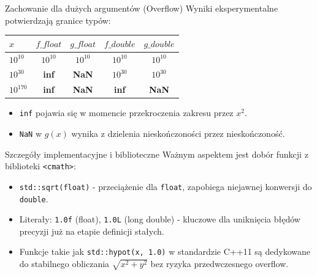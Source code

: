 \documentclass[10pt]{beamer}
\begin{document}
\begin{frame}{Zachowanie dla dużych argumentów (Overflow)}
    Wyniki eksperymentalne potwierdzają granice typów:
    \begin{table}[]
        \small
        \centering
        \begin{tabular}{@{}lcccc@{}}
            \toprule
            $x$ & $f\_float$ & $g\_float$ & $f\_double$ & $g\_double$ \\ \midrule
            $10^{10}$ & $10^{10}$ & $10^{10}$ & $10^{10}$ & $10^{10}$ \\
            $10^{30}$ & \textbf{inf} & \textbf{NaN} & $10^{30}$ & $10^{30}$ \\
            $10^{170}$ & \textbf{inf} & \textbf{NaN} & \textbf{inf} & \textbf{NaN} \\ \bottomrule
        \end{tabular}
    \end{table}
    \begin{itemize}
        \item \texttt{inf} pojawia się w momencie przekroczenia zakresu przez $x^2$.
        \item \texttt{NaN} w $g(x)$ wynika z dzielenia nieskończoności przez nieskończoność.
    \end{itemize}
\end{frame}

\begin{frame}{Szczegóły implementacyjne i biblioteczne}
    Ważnym aspektem jest dobór funkcji z biblioteki \texttt{<cmath>}:
    \begin{itemize}
        \item \texttt{std::sqrt(float)} - przeciążenie dla \texttt{float}, zapobiega niejawnej konwersji do \texttt{double}.
        \item Literały: \texttt{1.0f} (float), \texttt{1.0L} (long double) - kluczowe dla uniknięcia błędów precyzji już na etapie definicji stałych.
        \item Funkcje takie jak \texttt{std::hypot(x, 1.0)} w standardzie C++11 są dedykowane do stabilnego obliczania $\sqrt{x^2+y^2}$ bez ryzyka przedwczesnego overflow.
    \end{itemize}
\end{frame}
\end{document}
